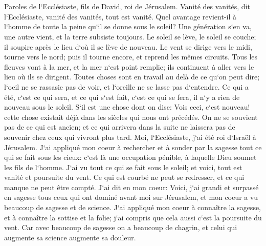 

\chapter{}

\verse Paroles de l`Ecclésiaste, fils de David, roi de Jérusalem. 
\verse Vanité des vanités, dit l`Ecclésiaste, vanité des vanités, tout est vanité. 
\verse Quel avantage revient-il à l`homme de toute la peine qu`il se donne sous le soleil? 
\verse Une génération s`en va, une autre vient, et la terre subsiste toujours. 
\verse Le soleil se lève, le soleil se couche; il soupire après le lieu d`où il se lève de nouveau. 
\verse Le vent se dirige vers le midi, tourne vers le nord; puis il tourne encore, et reprend les mêmes circuits. 
\verse Tous les fleuves vont à la mer, et la mer n`est point remplie; ils continuent à aller vers le lieu où ils se dirigent. 
\verse Toutes choses sont en travail au delà de ce qu`on peut dire; l`oeil ne se rassasie pas de voir, et l`oreille ne se lasse pas d`entendre. 
\verse Ce qui a été, c`est ce qui sera, et ce qui s`est fait, c`est ce qui se fera, il n`y a rien de nouveau sous le soleil. 
\verse S`il est une chose dont on dise: Vois ceci, c`est nouveau! cette chose existait déjà dans les siècles qui nous ont précédés. 
\verse On ne se souvient pas de ce qui est ancien; et ce qui arrivera dans la suite ne laissera pas de souvenir chez ceux qui vivront plus tard. 
\verse Moi, l`Ecclésiaste, j`ai été roi d`Israël à Jérusalem. 
\verse J`ai appliqué mon coeur à rechercher et à sonder par la sagesse tout ce qui se fait sous les cieux: c`est là une occupation pénible, à laquelle Dieu soumet les fils de l`homme. 
\verse J`ai vu tout ce qui se fait sous le soleil; et voici, tout est vanité et poursuite du vent. 
\verse Ce qui est courbé ne peut se redresser, et ce qui manque ne peut être compté. 
\verse J`ai dit en mon coeur: Voici, j`ai grandi et surpassé en sagesse tous ceux qui ont dominé avant moi sur Jérusalem, et mon coeur a vu beaucoup de sagesse et de science. 
\verse J`ai appliqué mon coeur à connaître la sagesse, et à connaître la sottise et la folie; j`ai compris que cela aussi c`est la poursuite du vent. 
\verse Car avec beaucoup de sagesse on a beaucoup de chagrin, et celui qui augmente sa science augmente sa douleur. 

\chapter{}

